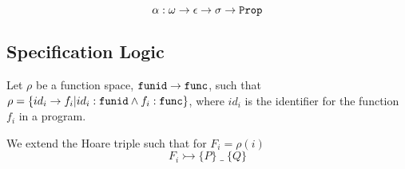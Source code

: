 \begin{equation}\label{eqn:alpha-type}
\alpha: \omega \rightarrow \epsilon \rightarrow \sigma \rightarrow \verb|Prop|
\end{equation}


\subsection{Specification Logic}
Let $\rho$ be a function space, 
$\verb|funid| \rightarrow \verb|func|$, 
such that 
$\rho = \{ id_i \rightarrow f_i | id_i : \verb|funid| \wedge f_i:\verb|func| \}$, 
where $id_i$ is the identifier for the function $f_i$ in a program.

We extend the Hoare triple such that for $F_i = \rho(i)$
\begin{equation}
F_i \rightarrowtail \{P\}\;\_\;\{Q\}
\end{equation}
